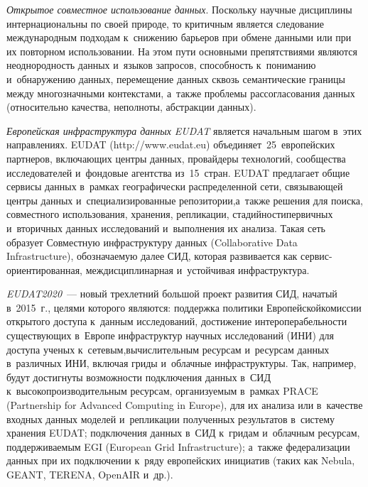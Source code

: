 \begin{multicols}{2}
  \textit{Открытое совместное использование данных}. Поскольку научные дисциплины 
интернациональны по своей природе, то критичным является следование международным 
подходам к~снижению барь\-е\-ров при обмене данными или при их повторном\linebreak 
использовании. На этом пути основными препятствиями являются неоднородность данных 
и~языков запросов, способность к~пониманию и~обнаружению данных, перемещение 
данных сквозь семантиче\-ские границы между многозначными контекстами, а~так\-же 
проблемы рассогласования данных (относительно качества, неполноты, абстракции 
данных).

  
  \textit{Европейская инфраструктура данных EUDAT} является начальным шагом в~этих 
направлениях. EUDAT ({\sf http://www.eudat.eu}) объединяет~25~европейских партнеров, 
включающих центры данных, провайдеры технологий, сообщества исследователей 
и~фондовые агентства из~15~стран. EUDAT предлагает общие сервисы данных в~рамках 
географически распределенной сети, связывающей цент\-ры данных и~специализированные 
репозитории,\linebreak а~также решения для поиска, совместного использования, хранения, 
репликации, ста\-дий\-ности\linebreak первичных и~вторичных данных исследований и~выполнения их 
анализа. Такая сеть образует {Совместную} инфраструктуру данных (Collaborative Data 
Infrastructure), обозначаемую далее СИД, которая развивается как  
сер\-вис-ори\-ен\-ти\-ро\-ван\-ная, междисциплинарная и~устойчивая инфраструктура.
{

}

  
  \textit{EUDAT2020}~--- новый трехлетний большой проект развития СИД, начатый 
в~2015~г., целями которого являются: поддержка политики Европейской\linebreak комиссии 
открытого доступа к~данным исследо\-ваний, достижение интероперабельности 
существующих в~Европе инфраструктур научных исследований (ИНИ) для доступа 
ученых к~сетевым,\linebreak вычислительным ресурсам и~ресурсам данных в~различных ИНИ, 
включая гриды и~облачные инфраструктуры. Так, например, будут достигнуты\linebreak 
возможности подключения данных в~СИД к~высокопроизводительным ресурсам, 
организуемым в~рамках PRACE (Partnership for Advanced Computing in Europe), 
для их анализа или в~качестве входных данных моделей 
и~репликации полученных результатов в~систему хранения EUDAT; подключения данных 
в~СИД к~гридам и~облачным ресурсам, поддерживаемым EGI (European Grid
Infrastructure); а~так\-же федерализации 
данных при их подключении к~ряду европейских инициатив (таких как Nebula, GEANT, 
TERENA, \mbox{OpenAIR} и~др.). 


\end{multicols}
